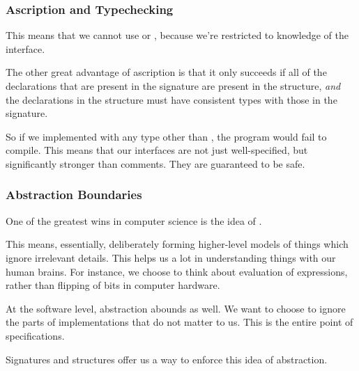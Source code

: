 \documentclass[aspectratio=169, handout]{beamer}
\begin{document}
\begin{frame}[fragile]
  \frametitle{Ascription and Typechecking}

  \tgs

  This means that we cannot use  or ,
  because we're restricted to knowledge of the interface.

  \pause
  \vspace{\fill}

  The other great advantage of ascription is that it only succeeds if
  all of the declarations that are present in the signature are present in
  the structure, \textit{and} the declarations in the structure must have
  consistent types with those in the signature.

  \pause
  \vspace{\fill}

  So if we implemented  with any type other than
  , the program would
  fail to compile. This means that our interfaces are not just well-specified,
  but significantly stronger than comments. They are guaranteed to be safe.
\end{frame}


\begin{frame}[fragile]
  \frametitle{Abstraction Boundaries}

  One of the greatest wins in computer science is the idea of .

  \pause
  \vspace{\fill}

  This means, essentially, deliberately forming higher-level models of things which
  ignore irrelevant details. This helps us a lot in understanding things with our
  human brains. For instance, we choose to think about evaluation of expressions,
  rather than flipping of bits in computer hardware.

  \pause
  \vspace{\fill}

  At the software level, abstraction abounds as well. We want to choose to
  ignore the parts of implementations that do not matter to us. This is the
  entire point of specifications.

  \pause
  \vspace{\fill}

  Signatures and structures offer us a way to enforce this idea of abstraction.
\end{frame}
\end{document}
